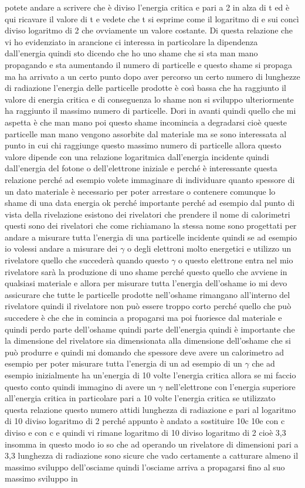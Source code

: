 {potete andare a scrivere che è diviso l'energia critica e pari a 2 in alza di t ed è qui ricavare il valore di t e vedete che t si esprime come il logaritmo di e sui concì diviso logaritmo di 2 che ovviamente un valore costante. Di questa relazione che vi ho evidenziato in arancione ci interessa in particolare la dipendenza dall'energia quindi sto dicendo che ho uno shame che si sta man mano propagando e sta aumentando il numero di particelle e questo shame si propaga ma ha arrivato a un certo punto dopo aver percorso un certo numero di lunghezze di radiazione l'energia delle particelle prodotte è così bassa che ha raggiunto il valore di energia critica e di conseguenza lo shame non si sviluppo ulteriormente ha raggiunto il massimo numero di particelle. Dori in avanti quindi quello che mi aspetta è che man mano poi questo shame incomincia a degradarsi cioè queste particelle man mano vengono assorbite dal materiale ma se sono interessata al punto in cui chi raggiunge questo massimo numero di particelle allora questo valore dipende con una relazione logaritmica dall'energia incidente quindi dall'energia del fotone o dell'elettrone iniziale e perché è interessante questa relazione perché ad esempio volete immaginare di individuare quanto spessore di un dato materiale è necessario per poter arrestare o contenere comunque lo shame di una data energia ok perché importante perché ad esempio dal punto di vista della rivelazione esistono dei rivelatori che prendere il nome di calorimetri questi sono dei rivelatori che come richiamano la stessa nome sono progettati per andare a misurare tutta l'energia di una particelle incidente quindi se ad esempio io volessi andare a misurare dei $\gamma$ o degli elettroni molto energetici e utilizzo un rivelatore quello che succederà quando questo $\gamma$ o questo elettrone entra nel mio rivelatore sarà la produzione di uno shame perché questo quello che avviene in qualsiasi materiale e allora per misurare tutta l'energia dell'oshame io mi devo assicurare che tutte le particelle prodotte nell'oshame rimangano all'interno del rivelatore quindi il rivelatore non può essere troppo corto perché quello che può succedere è che che in comincia a propagarsi ma poi fuoriesce dal materiale e quindi perdo parte dell'oshame quindi parte dell'energia quindi è importante che la dimensione del rivelatore sia dimensionata alla dimensione dell'oshame che si può produrre e quindi mi domando che spessore deve avere un calorimetro ad esempio per poter misurare tutta l'energia di un ad esempio di un $\gamma$ che ad esempio inizialmente ha un'energia di 10 volte l'energia critica allora se mi faccio questo conto quindi immagino di avere un $\gamma$ nell'elettrone con l'energia superiore all'energia critica in particolare pari a 10 volte l'energia critica se utilizzato questa relazione questo numero attidi lunghezza di radiazione e pari al logaritmo di 10 diviso logaritmo di 2 perché appunto è andato a sostituire 10c 10e con c diviso e con c e quindi vi rimane logaritmo di 10 diviso logaritmo di 2 cioè 3,3 insomma in questo modo io so che ad operando un rivelatore di dimensioni pari a 3,3 lunghezza di radiazione sono sicure che vado certamente a catturare almeno il massimo sviluppo dell'osciame quindi l'osciame arriva a propagarsi fino al suo massimo sviluppo in }
